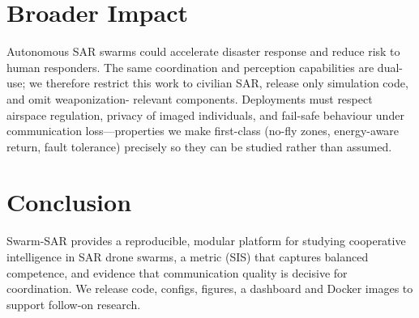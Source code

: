 \documentclass[conference]{IEEEtran}
\begin{document}
\section{Broader Impact}
Autonomous SAR swarms could accelerate disaster response and reduce risk to human
responders. The same coordination and perception capabilities are dual-use; we therefore
restrict this work to civilian SAR, release only simulation code, and omit weaponization-
relevant components. Deployments must respect airspace regulation, privacy of imaged
individuals, and fail-safe behaviour under communication loss---properties we make
first-class (no-fly zones, energy-aware return, fault tolerance) precisely so they can be
studied rather than assumed.

\section{Conclusion}
Swarm-SAR provides a reproducible, modular platform for studying cooperative
intelligence in SAR drone swarms, a metric (SIS) that captures balanced
competence, and evidence that communication quality is decisive for coordination.
We release code, configs, figures, a dashboard and Docker images to support
follow-on research.



\end{document}
